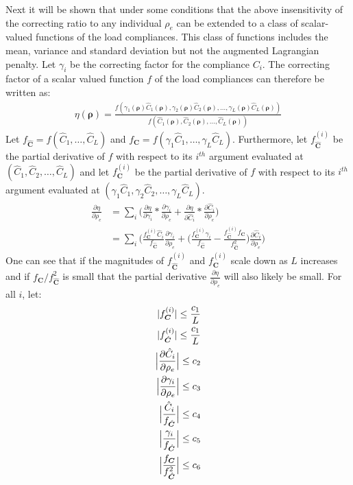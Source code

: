 Next it will be shown that under some conditions that the above insensitivity of the correcting ratio to any individual $\rho_e$ can be extended to a class of scalar-valued functions of the load compliances. This class of functions includes the mean, variance and standard deviation but not the augmented Lagrangian penalty. Let $\gamma_i$ be the correcting factor for the compliance $C_i$. The correcting factor of a scalar valued function $f$ of the load compliances can therefore be written as:
\begin{align}
  \eta(\bm{\rho}) = \frac{f(\gamma_1(\bm{\rho}) \hat{C}_1(\bm{\rho}), \gamma_2(\bm{\rho}) \hat{C}_2(\bm{\rho}), \dots, \gamma_L(\bm{\rho}) \hat{C}_L(\bm{\rho}))}{f(\hat{C}_1(\bm{\rho}), \hat{C}_2(\bm{\rho}), \dots, \hat{C}_L(\bm{\rho}))}
\end{align}
Let $f_{\bm{\hat{C}}} = f(\hat{C}_1, \dots, \hat{C}_L)$ and $f_{\bm{C}} = f(\gamma_1 \hat{C}_1, \dots, \gamma_L \hat{C}_L)$. Furthermore, let $f_{\bm{\hat{C}}}^{(i)}$ be the partial derivative of $f$ with respect to its $i^{th}$ argument evaluated at $(\hat{C}_1, \hat{C}_2, \dots, \hat{C}_L)$ and let $f_{\bm{C}}^{(i)}$ be the partial derivative of $f$ with respect to its $i^{th}$ argument evaluated at $(\gamma_1 \hat{C}_1, \gamma_2 \hat{C}_2, \dots, \gamma_L \hat{C}_L)$.
\begin{align}
  \frac{\partial \eta}{\partial \rho_e} & 
  = \sum_i \Biggl(\frac{\partial \eta}{\partial \gamma_i} * \frac{\partial \gamma_i}{\partial \rho_e} + 
  \frac{\partial \eta}{\partial \hat{C}_i} * \frac{\partial \hat{C}_i}{\partial \rho_e}\Biggr) \\
  & = \sum_i \Biggl( \frac{f_{\bm{C}}^{(i)} \hat{C}_i}{f_{\hat{\bm{C}}}} \frac{\partial \gamma_i}{\partial \rho_e} + \Biggl( \frac{f_{\bm{C}}^{(i)} \gamma_i}{f_{\bm{\hat{C}}}} - \frac{f_{\bm{\hat{C}}}^{(i)} f_{\bm{C}}}{f_{\hat{\bm{C}}}^2} \Biggr) \frac{\partial \hat{C}_i}{\partial \rho_e} \Biggr)
\end{align}
One can see that if the magnitudes of $f_{\hat{\bm{C}}}^{(i)}$ and $f_{\bm{C}}^{(i)}$ scale down as $L$ increases and if $f_{\bm{C}} / f_{\hat{\bm{C}}}^2$ is small that the partial derivative $\frac{\partial \eta}{\partial \rho_e}$ will also likely be small. For all $i$, let:
\begin{align}
  |f_{\bm{C}}^{(i)}| \leq \frac{c_1}{L} \\
  |f_{\hat{\bm{C}}}^{(i)}| \leq \frac{c_1}{L} \\
  \Bigl| \frac{\partial \hat{C}_i}{\partial \rho_e} \Bigr| \leq c_2 \\
  \Bigl| \frac{\partial \gamma_i}{\partial \rho_e} \Bigr| \leq c_3 \\
  \Bigl| \frac{\hat{C}_i}{f_{\hat{\bm{C}}}} \Bigr| \leq c_4 \\
  \Bigl| \frac{\gamma_i}{f_{\hat{\bm{C}}}} \Bigr| \leq c_5 \\
  \Bigl| \frac{f_{\bm{C}}}{f_{\hat{\bm{C}}}^2} \Bigr| \leq c_6
\end{align}
